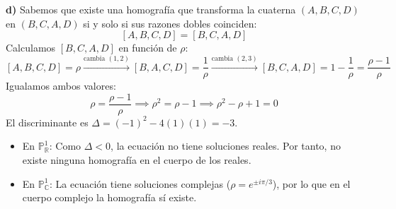 {\textbf{d)}
Sabemos que existe una homografía que transforma la cuaterna $(A, B, C, D)$ en $(B, C, A, D)$ si y solo si sus razones dobles coinciden:
\[ [A, B, C, D] = [B, C, A, D] \]
Calculamos $[B, C, A, D]$ en función de $\rho$:
\[ [A, B, C, D] = \rho \xrightarrow{\text{cambia } (1,2)} [B, A, C, D] = \frac{1}{\rho} \xrightarrow{\text{cambia } (2,3)} [B, C, A, D] = 1 - \frac{1}{\rho} = \frac{\rho - 1}{\rho} \]
Igualamos ambos valores:
\[ \rho = \frac{\rho - 1}{\rho} \implies \rho^2 = \rho - 1 \implies \rho^2 - \rho + 1 = 0 \]
El discriminante es $\Delta = (-1)^2 - 4(1)(1) = -3$.
\begin{itemize}
    \item En $\mathbb{P}_{\mathbb{R}}^{1}$: Como $\Delta < 0$, la ecuación no tiene soluciones reales. Por tanto, no existe ninguna homografía en el cuerpo de los reales.
    \item En $\mathbb{P}_{\mathbb{C}}^{1}$: La ecuación tiene soluciones complejas ($\rho = e^{\pm i\pi/3}$), por lo que en el cuerpo complejo la homografía sí existe.
\end{itemize}
}

